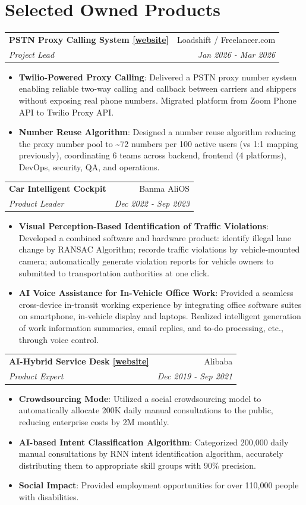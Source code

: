 \documentclass[letterpaper,11pt]{article}
\makeatletter
\newcommand{\resumeItem}[2]{
  \item\small{
    \textbf{#1}{: #2 \vspace{-2pt}}
  }
}
\newcommand{\resumeSubheading}[4]{
  \vspace{-3pt}\item
    \begin{tabular*}{0.97\textwidth}{l@{\extracolsep{\fill}}r}
      \textbf{#1} & #2 \\
      \textit{\small#3} & \textit{\small #4} \\
    \end{tabular*}\vspace{-8pt}
}
\newcommand{\resumeSubHeadingListStart}{}
\newcommand{\resumeItemListStart}{\begin{itemize}}
\newcommand{\resumeItemListEnd}{\end{itemize}\vspace{-8pt}}
\makeatother
\begin{document}
\vspace{5pt}


\vspace{5pt}

\section{Selected Owned Products}
  \resumeSubHeadingListStart
   \resumeSubheading{PSTN Proxy Calling System \href{https://www.loadshift.com.au/}{[website]}}{Loadshift / Freelancer.com}{Project Lead}{Jan 2026 - Mar 2026}
    \resumeItemListStart
        \resumeItem{Twilio-Powered Proxy Calling}
        {Delivered a PSTN proxy number system enabling reliable two-way calling and callback between carriers and shippers without exposing real phone numbers. Migrated platform from Zoom Phone API to Twilio Proxy API.}
          \resumeItem{Number Reuse Algorithm}
          {Designed a number reuse algorithm reducing the proxy number pool to \textasciitilde72 numbers per 100 active users (vs 1:1 mapping previously), coordinating 6 teams across backend, frontend (4 platforms), DevOps, security, QA, and operations.}
      \resumeItemListEnd
\vspace{5pt}

   \resumeSubheading{Car Intelligent Cockpit}{Banma AliOS}{Product Leader }{Dec 2022 - Sep 2023}
    \resumeItemListStart
        \resumeItem{Visual Perception-Based Identification of Traffic Violations}
        {Developed a combined software and hardware product: identify illegal lane change by RANSAC Algorithm; recorde traffic violations by vehicle-mounted camera; automatically generate violation reports for vehicle owners to submitted to transportation authorities at one click. }
          \resumeItem{AI Voice Assistance for In-Vehicle Office Work}
          {Provided a seamless cross-device in-transit working experience by integrating office software suites on smartphone, in-vehicle display and laptops. Realized intelligent generation of work information summaries, email replies, and to-do processing, etc., through voice control.}
      \resumeItemListEnd
\vspace{5pt}

   \resumeSubheading{AI-Hybrid Service Desk \href{https://gtxwsy.yuque.com/gtxwsy/miv5ag/ih3dqq?}{[website]}}{Alibaba}
    {Product Expert}{Dec 2019 - Sep 2021}
    \resumeItemListStart
        \resumeItem{Crowdsourcing Mode}
        {Utilized a social crowdsourcing model to automatically allocate 200K daily manual consultations to the public, reducing enterprise costs by 2M monthly.}
          \resumeItem{AI-based Intent Classification Algorithm}
          {Categorized 200,000 daily manual consultations by RNN intent identification algorithm, accurately distributing them to appropriate skill groups with 90\% precision.}
          \resumeItem{Social Impact}
          {Provided employment opportunities for over 110,000 people with disabilities.}
      \resumeItemListEnd
\end{document}
